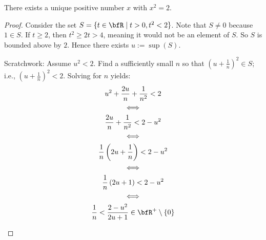     \begin{theorem}
        There exists a unique positive number $x$ with $x^2 = 2$.
    \end{theorem}
        \begin{proof}
            Consider the set $S = \{t \in \bfR \mid t > 0, t^2 < 2 \}$. Note that $S \neq 0$ because $1 \in S$. If $t \geq 2$, then $t^2 \geq 2t > 4$, meaning it would not be an element of $S$. So $S$ is bounded above by $2$. Hence there exists $u := \sup(S)$.
                \begin{center}
                \end{center}
            
            \vspace{-10pt}
            {\smaller Scratchwork: Assume $u^2 < 2$. Find a sufficiently small $n$ so that $(u + \frac{1}{n})^2 \in S$; i.e.,   $(u + \frac{1}{n})^2 < 2$. Solving for $n$ yields:
                \begin{gather*}
                    u^2 + \frac{2u}{n} + \frac{1}{n^2} < 2 \\
                    \iff \\
                    \frac{2u}{n} + \frac{1}{n^2} < 2 - u^2 \\
                    \iff \\
                    \frac{1}{n} \left(2u + \frac{1}{n}\right) < 2-u^2\\
                    \iff \\
                    \frac{1}{n} \left(2u + 1\right) < 2-u^2 \\
                    \iff \\
                    \frac{1}{n} < \frac{2-u^2}{2u+1} \in \bfR^+\setminus\{0\}
                \end{gather*}}
                \vspace{-20pt}
                \begin{center}
                \end{center}
            


\end{proof}
